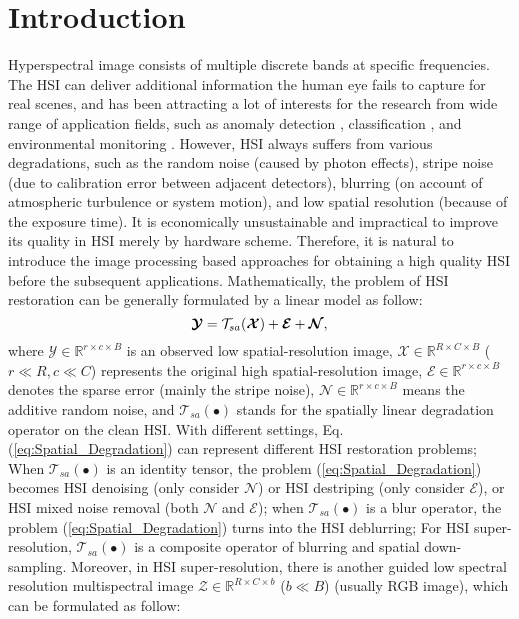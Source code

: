 \documentclass[twocolumn]{svjour3}          %
\begin{document}
\section{Introduction}
\label{intro}
  Hyperspectral image consists of multiple discrete bands at specific frequencies. The HSI can deliver additional information the human eye fails to capture for real scenes, and has been attracting a lot of interests for the research from wide range of application fields, such as anomaly detection \cite{du2014discriminative}, classification \cite{ji2014spectral}, and environmental monitoring \cite{moroni2013hyperspectral}. However, HSI always suffers from various degradations, such as the random noise (caused by photon effects), stripe noise (due to calibration error between adjacent detectors), blurring (on account of atmospheric turbulence or system motion), and low spatial resolution (because of the exposure time). It is economically unsustainable and impractical to improve its quality in HSI merely by hardware scheme. Therefore, it is natural to introduce the image processing based approaches for obtaining a high quality HSI before the subsequent applications. Mathematically, the problem of HSI restoration can be generally formulated by a linear model as follow:
  \begin{equation}\label{eq:Spatial_Degradation}
  \setlength{\abovedisplayskip}{2pt}
  \setlength{\belowdisplayskip}{2pt}
  {\boldsymbol{\mathcal{Y}}} = {\mathcal{T}_{sa}}({\boldsymbol{\mathcal{X}}}) + {\boldsymbol{\mathcal{E}}} + {\boldsymbol{\mathcal{N}}},
  \end{equation}
  where ${\boldsymbol{\mathcal{Y}}} \in {\mathbb{R}^{r \times c \times B}}$ is an observed low spatial-resolution image, ${\boldsymbol{\mathcal{X}}} \in {\mathbb{R}^{R \times C \times B}}$ ($r \ll R,c \ll C$) represents the original high spatial-resolution image, ${\boldsymbol{\mathcal{E}}} \in {\mathbb{R}^{r \times c \times B}}$ denotes the sparse error (mainly the stripe noise), ${\boldsymbol{\mathcal{N}}} \in {\mathbb{R}^{r \times c \times B}}$ means the additive random noise, and ${\mathcal{T}_{sa}}( \bullet )$ stands for the spatially linear degradation operator on the clean HSI. With different settings, Eq. (\ref{eq:Spatial_Degradation}) can represent different HSI restoration problems; When ${\mathcal{T}_{sa}}( \bullet )$ is an identity tensor, the problem (\ref{eq:Spatial_Degradation}) becomes HSI denoising (only consider ${\boldsymbol{\mathcal{N}}}$) or HSI destriping (only consider ${\boldsymbol{\mathcal{E}}}$), or HSI mixed noise removal (both ${\boldsymbol{\mathcal{N}}}$ and ${\boldsymbol{\mathcal{E}}}$); when ${\mathcal{T}_{sa}}( \bullet )$ is a blur operator, the problem (\ref{eq:Spatial_Degradation}) turns into the HSI deblurring; For HSI super-resolution, ${\mathcal{T}_{sa}}( \bullet )$ is a composite operator of blurring and spatial down-sampling. Moreover, in HSI super-resolution, there is another guided low spectral resolution multispectral image ${\boldsymbol{\mathcal{Z}}} \in {\mathbb{R}^{R \times C \times b}}$ ($b \ll B$) (usually RGB image), which can be formulated as follow:
\end{document}
